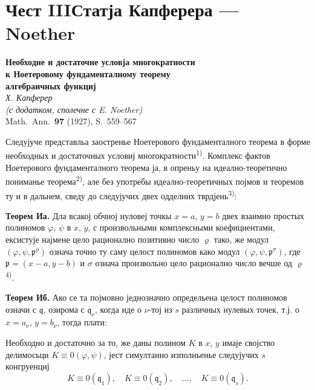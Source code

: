 \documentclass[11pt]{article}
\newcommand{\foreign}[1]{#1}
\theoremstyle{plain}
\begin{document}
\newpage
\part*{Чест III\hspace{1em}Статја Капферера --- Noether}

\begin{center}
\Large\textbf{Необходне и достаточне условја многократности}\\[0.3em]
\Large\textbf{к Ноетеровому фундаменталному теорему}\\[0.5em]
\large\textbf{алгебраичных функциј}\\[1em]
\normalsize\textit{Х. Капферер}\\[0.5em]
\small\textit{(с додатком, сполечне с E. Noether)}\\[1em]
\normalsize \foreign{Math.\ Ann.}\ \textbf{97} (1927), S.~559--567
\end{center}

\vspace{1em}

Следујуче представльа заостренье Ноетерового фундаменталного
теорема в форме необходных и достаточных условиј
многократности\textsuperscript{1)}. Комплекс фактов Ноетерового
фундаменталного теорема ја, в опреньу на идеално-теоретично
пониманье теорема\textsuperscript{2)}, але без употребы
идеално-теоретичных појмов и теоремов ту и в дальнем, сведу до
следујучих двех одделних тврдјень\textsuperscript{3)}:

\smallskip
\textbf{Теорем Иа.} Дла всакој обчној нуловеј точкы $x = a$,
$y = b$ двех взаимно простых полиномов $\varphi$, $\psi$ в $x$, $y$,
с произвольными комплексными коефициентами, ексистује најмене цело
рационално позитивно число $\varrho$ тако, же модул
$(\varphi, \psi, \mathfrak{p}^{\varrho})$ означа точно ту саму
целост полиномов како модул $(\varphi, \psi, \mathfrak{p}^{\sigma})$,
где $\mathfrak{p} = (x-a, y-b)$ и $\sigma$ означа произвольно цело
рационално число вечше од $\varrho$\textsuperscript{4)}.

\smallskip
\textbf{Теорем Иб.} Ако се та појмовно једнозначно определьена
целост полиномов означи с $\mathfrak{q}$, озирома с
$\mathfrak{q}_{\nu}$, когда иде о $\nu$-тој из $s$ различных нулевых
точек, т.ј. о $x = a_{\nu}$, $y = b_{\nu}$, тогда плати:

Необходно и достаточно за то, же даны полином $K$ в $x$, $y$ имаје
својство делимосьци $K \equiv 0(\varphi, \psi)$, јест симултанно
изполньенье следујучих $s$ конгруенциј
\[
K \equiv 0(\mathfrak{q}_{1}), \quad K \equiv 0(\mathfrak{q}_{2}), \quad\ldots,\quad
K \equiv 0(\mathfrak{q}_{s}).
\]
\end{document}

